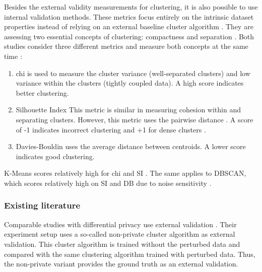 Besides the external validity measurements for clustering, it is also possible to use internal validation methods.
These metrics focus entirely on the intrinsic dataset properties instead of relying on an external baseline cluster algorithm \citep{craenendonck_using_nodate}.
They are assessing two essential concepts of clustering: compactness and separation \citep{hassani_using_2017}.
Both studies consider three different metrics and measure both concepts at the same time \citep{hassani_using_2017}:
\begin{enumerate}
  \item \gls{chi} \citep{calinski_dendrite_1974} is used to measure the cluster variance (well-separated clusters) and low variance within the clusters (tightly coupled data). A high score indicates better clustering.
  \item Silhouette Index \citep{rousseeuw_silhouettes_1987} This metric is similar in measuring cohesion within and separating clusters.
        However, this metric uses the pairwise distance \cite{hassani_using_2017}.
        A score of -1 indicates incorrect clustering and +1 for dense clusters \cite{rousseeuw_silhouettes_1987}.
  \item Davies-Bouldin \citep{davies_cluster_1979} uses the average distance between centroids. A lower score indicates good clustering.
\end{enumerate}

K-Means scores relatively high for \gls{chi} \citep{craenendonck_using_nodate,hassani_using_2017} and SI \citep{craenendonck_using_nodate}.
The same applies to DBSCAN, which scores relatively high on SI and DB due to noise sensitivity \citep{craenendonck_using_nodate}.

\subsubsection{Existing literature}
Comparable studies with differential privacy use external validation \citep{xia_distributed_2020, sun_privbv_2022}.
Their experiment setup uses a so-called non-private cluster algorithm as external validation.
This cluster algorithm is trained without the perturbed data and compared with the same clustering algorithm trained with perturbed data.
Thus, the non-private variant provides the ground truth as an external validation.

